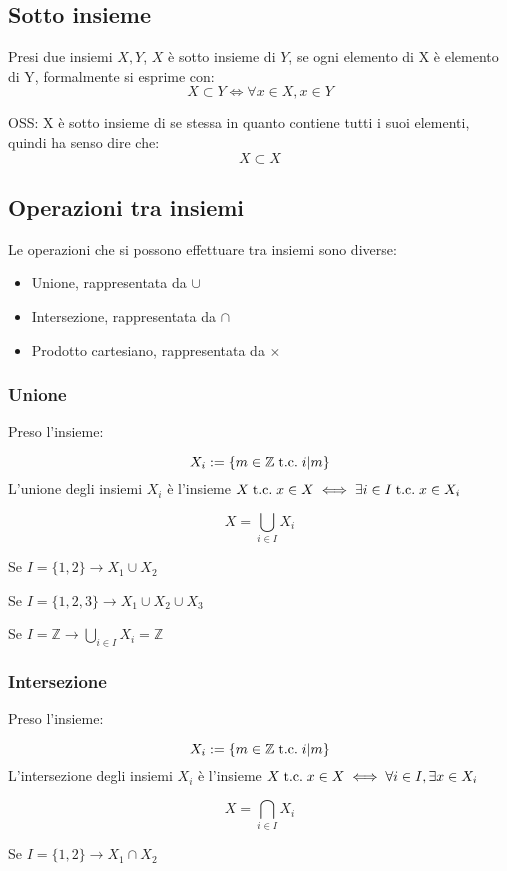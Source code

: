 \documentclass[a4paper,12pt]{article}
\begin{document}
	\subsection{Sotto insieme}
	Presi due insiemi $X, Y$, $X$ è sotto insieme di $Y$, se ogni elemento di X è elemento di Y, formalmente si esprime con:
	\[
	X \subset Y \iff \forall x \in X, x \in Y
	\]
	
	OSS: X è sotto insieme di se stessa in quanto contiene tutti i suoi elementi, quindi ha senso dire che:
	\[
	X \subset X
	\]
	
	\subsection{Operazioni tra insiemi}
	Le operazioni che si possono effettuare tra insiemi sono diverse:
	\begin{itemize}
		\item Unione, rappresentata da $\cup$
		\item Intersezione, rappresentata da $\cap$
		\item Prodotto cartesiano, rappresentata da $\times$
	\end{itemize}
	
	\subsubsection{Unione}
	Preso l'insieme:
	 
	\[
	X_i := \{m \in \mathbb{Z} \;\text{t.c.}\; i | m\}
	\]
	L'unione degli insiemi $X_i$ è l'insieme $X \;\text{t.c.}\; x\in X \iff \exists i \in I \;\text{t.c.}\; x \in X_i$
	
	\[
	X = \bigcup_{i \in I} X_i
	\]
	
	Se $I = \{1, 2\} \rightarrow X_1 \cup X_2$
	
	Se $I = \{1, 2, 3\} \rightarrow X_1 \cup X_2 \cup X_3$
		
	Se $\displaystyle I = \mathbb{Z} \rightarrow \bigcup_{i \in I} X_i = \mathbb{Z}$
	
	\subsubsection{Intersezione}
	Preso l'insieme:
	
	\[
	X_i := \{m \in \mathbb{Z} \;\text{t.c.}\; i | m\}
	\]
	L'intersezione degli insiemi $X_i$ è l'insieme $X \;\text{t.c.}\; x\in X \iff \forall i \in I, \exists x \in X_i$
	
	\[
	X = \bigcap_{i \in I} X_i
	\]
	
	Se $I = \{1, 2\} \rightarrow X_1 \cap X_2$
	
\end{document}
